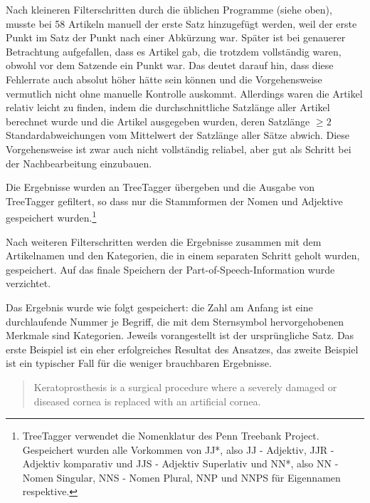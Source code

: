 \documentclass[pagesize,DIV=calc,12pt,final]{scrreprt}
\begin{document}
\begin{inparaenum}
\item Nach kleineren Filterschritten durch die üblichen Programme (siehe oben), musste bei 58 Artikeln manuell der erste Satz hinzugefügt werden, weil der erste Punkt im Satz der Punkt nach einer Abkürzung war. 
Später ist bei genauerer Betrachtung aufgefallen, dass es Artikel gab, die trotzdem vollständig waren, obwohl vor dem Satzende ein Punkt war. 
Das deutet darauf hin, dass diese Fehlerrate auch absolut höher hätte sein können und die Vorgehensweise vermutlich nicht ohne manuelle Kontrolle auskommt. 
Allerdings waren die Artikel relativ leicht zu finden, indem die durchschnittliche Satzlänge aller Artikel berechnet wurde und die Artikel ausgegeben wurden, deren Satzlänge $\geq 2 $ Standardabweichungen vom Mittelwert der Satzlänge aller Sätze abwich. 
Diese Vorgehensweise ist zwar auch nicht vollständig reliabel, aber gut als Schritt bei der Nachbearbeitung einzubauen. 

Die Ergebnisse wurden an TreeTagger übergeben und die Ausgabe von TreeTagger gefiltert, so dass nur die Stammformen der Nomen und Adjektive gespeichert wurden.\footnote{TreeTagger verwendet die Nomenklatur des Penn Treebank Project. 
Gespeichert wurden alle Vorkommen von JJ*, also JJ - Adjektiv, JJR - Adjektiv komparativ und JJS - Adjektiv Superlativ und NN*, also NN - Nomen Singular, NNS - Nomen Plural, NNP und NNPS für Eigennamen respektive.} 

\item Nach weiteren Filterschritten werden die Ergebnisse zusammen mit dem Artikelnamen und den Kategorien, die in einem separaten Schritt geholt wurden, gespeichert. 
Auf das finale Speichern der Part-of-Speech-Information wurde verzichtet. 
\end{inparaenum}

Das Ergebnis wurde wie folgt gespeichert: die Zahl am Anfang ist eine durchlaufende Nummer je Begriff, die mit dem Sternsymbol hervorgehobenen Merkmale sind Kategorien. 
Jeweils vorangestellt ist der ursprüngliche Satz. 
Das erste Beispiel ist ein eher erfolgreiches Resultat des Ansatzes, das zweite Beispiel ist ein typischer Fall für die weniger brauchbaren Ergebnisse. 

\begin{quote}
Keratoprosthesis is a surgical procedure where a severely damaged or diseased cornea is replaced with an artificial cornea.
\end{quote}

\lstset{
	numbers=left,
        language=Bash,
	basicstyle=\ttfamily\footnotesize,
	extendedchars=true,
	inputencoding=utf8,
	breaklines=true,
	breakindent=0pt,
}
\end{document}
